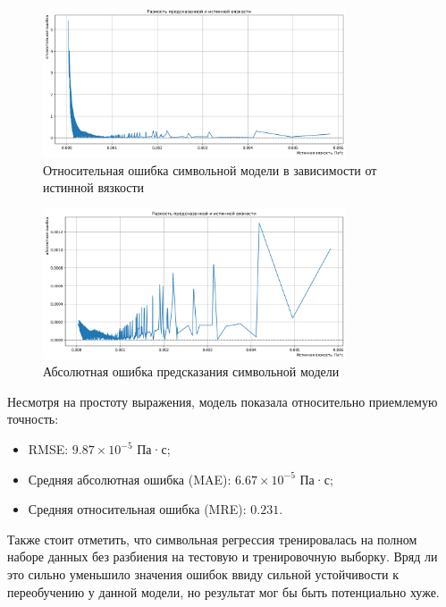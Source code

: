\documentclass[a4paper,12pt]{article}
\begin{document}
    \begin{figure}[ht!]
      \centering
      \includegraphics[width=0.8\textwidth]{SR_percent.png}
      \caption{Относительная ошибка символьной модели в зависимости от истинной вязкости}
      \label{fig:sr_percent}
    \end{figure}
    
    \begin{figure}[ht!]
      \centering
      \includegraphics[width=0.8\textwidth]{SR_rmse.png}
      \caption{Абсолютная ошибка предсказания символьной модели}
      \label{fig:sr_rmse}
    \end{figure}
    
    \medskip
    
    Несмотря на простоту выражения, модель показала относительно приемлемую точность:
    
    \begin{itemize}
      \item RMSE: \( 9.87 \times 10^{-5} \) Па·с;
      \item Средняя абсолютная ошибка (MAE): \( 6.67 \times 10^{-5} \) Па·с;
      \item Средняя относительная ошибка (MRE): \( 0.231 \).
    \end{itemize}

    Также стоит отметить, что символьная регрессия тренировалась на полном наборе данных без разбиения на тестовую и тренировочную выборку. Вряд ли это сильно уменьшило значения ошибок ввиду сильной устойчивости к переобучению у данной модели, но результат мог бы быть потенциально хуже.
    
\end{document}
